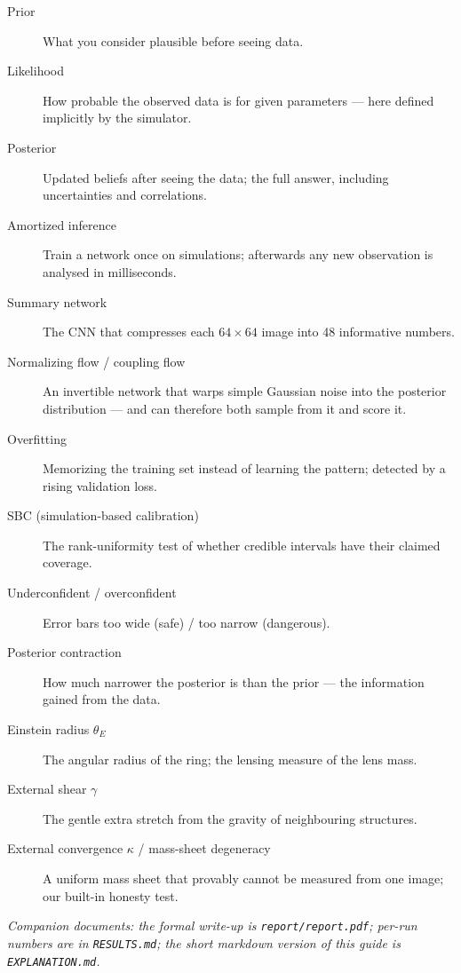 \documentclass[11pt,a4paper]{article}
\begin{document}
\begin{description}
  \item[Prior] What you consider plausible before seeing data.
  \item[Likelihood] How probable the observed data is for given parameters ---
  here defined implicitly by the simulator.
  \item[Posterior] Updated beliefs after seeing the data; the full answer,
  including uncertainties and correlations.
  \item[Amortized inference] Train a network once on simulations; afterwards any
  new observation is analysed in milliseconds.
  \item[Summary network] The CNN that compresses each $64{\times}64$ image into
  48 informative numbers.
  \item[Normalizing flow / coupling flow] An invertible network that warps simple
  Gaussian noise into the posterior distribution --- and can therefore both sample
  from it and score it.
  \item[Overfitting] Memorizing the training set instead of learning the pattern;
  detected by a rising validation loss.
  \item[SBC (simulation-based calibration)] The rank-uniformity test of whether
  credible intervals have their claimed coverage.
  \item[Underconfident / overconfident] Error bars too wide (safe) / too narrow
  (dangerous).
  \item[Posterior contraction] How much narrower the posterior is than the prior
  --- the information gained from the data.
  \item[Einstein radius $\theta_E$] The angular radius of the ring; the lensing
  measure of the lens mass.
  \item[External shear $\gamma$] The gentle extra stretch from the gravity of
  neighbouring structures.
  \item[External convergence $\kappa$ / mass-sheet degeneracy] A uniform mass
  sheet that provably cannot be measured from one image; our built-in honesty
  test.
\end{description}

\vspace{1em}
\noindent\textit{Companion documents: the formal write-up is
\texttt{report/report.pdf}; per-run numbers are in \texttt{RESULTS.md}; the
short markdown version of this guide is \texttt{EXPLANATION.md}.}
\end{document}
